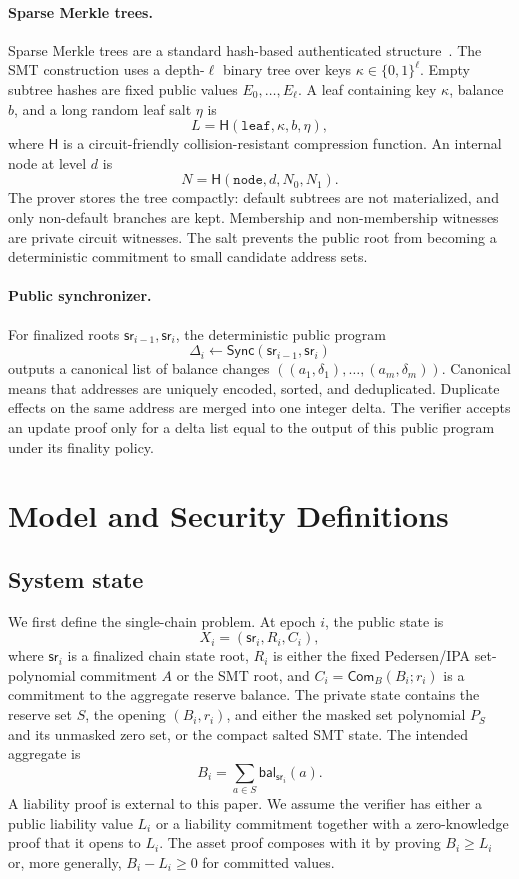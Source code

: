 \documentclass[runningheads]{llncs}
\newcommand{\bits}{\{0,1\}}
\newcommand{\Com}{\mathsf{Com}}
\newcommand{\CRH}{\mathsf{H}}
\newcommand{\bal}{\mathsf{bal}}
\newcommand{\sr}{\mathsf{sr}}
\newcommand{\Sync}{\mathsf{Sync}}
\newcommand{\dlist}{\Delta}
\begin{document}
\paragraph{Sparse Merkle trees.}
Sparse Merkle trees are a standard hash-based authenticated structure~\cite{Merkle88}.  The SMT construction uses a depth-\(\ell\) binary tree over keys \(\kappa\in\bits^\ell\).  Empty subtree hashes are fixed public values \(E_0,\ldots,E_\ell\).  A leaf containing key \(\kappa\), balance \(b\), and a long random leaf salt \(\eta\) is
\[
        L=\CRH(\mathtt{leaf},\kappa,b,\eta),
\]
where \(\CRH\) is a circuit-friendly collision-resistant compression function.  An internal node at level \(d\) is
\[
        N=\CRH(\mathtt{node},d,N_0,N_1).
\]
The prover stores the tree compactly: default subtrees are not materialized, and only non-default branches are kept.  Membership and non-membership witnesses are private circuit witnesses.  The salt prevents the public root from becoming a deterministic commitment to small candidate address sets.

\paragraph{Public synchronizer.}
For finalized roots \(\sr_{i-1},\sr_i\), the deterministic public program
\[
        \dlist_i\leftarrow \Sync(\sr_{i-1},\sr_i)
\]
outputs a canonical list of balance changes \(((a_1,\delta_1),\ldots,(a_m,\delta_m))\).  Canonical means that addresses are uniquely encoded, sorted, and deduplicated.  Duplicate effects on the same address are merged into one integer delta.  The verifier accepts an update proof only for a delta list equal to the output of this public program under its finality policy.

\section{Model and Security Definitions}

\subsection{System state}

We first define the single-chain problem.  At epoch \(i\), the public state is
\[
        X_i=(\sr_i,R_i,C_i),
\]
where \(\sr_i\) is a finalized chain state root, \(R_i\) is either the fixed Pedersen/IPA set-polynomial commitment \(A\) or the SMT root, and \(C_i=\Com_B(B_i;r_i)\) is a commitment to the aggregate reserve balance.  The private state contains the reserve set \(S\), the opening \((B_i,r_i)\), and either the masked set polynomial \(P_S\) and its unmasked zero set, or the compact salted SMT state.  The intended aggregate is
\[
        B_i=\sum_{a\in S}\bal_{\sr_i}(a).
\]
A liability proof is external to this paper.  We assume the verifier has either a public liability value \(L_i\) or a liability commitment together with a zero-knowledge proof that it opens to \(L_i\).  The asset proof composes with it by proving \(B_i\ge L_i\) or, more generally, \(B_i-L_i\ge 0\) for committed values.
\end{document}
